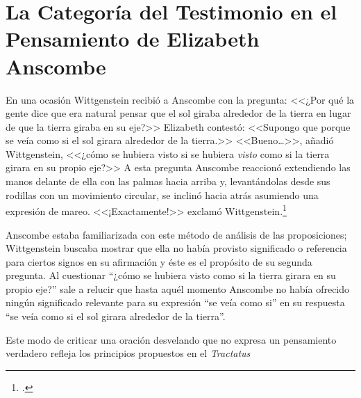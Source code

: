\documentclass[../main.tex]{subfiles}
\begin{document}
\chapter*{La Categoría del Testimonio en el Pensamiento de Elizabeth Anscombe}


En una ocasión Wittgenstein recibió a Anscombe con la pregunta: <<¿Por qué la gente dice que era natural pensar que el sol giraba alrededor de la tierra en lugar de que la tierra giraba en su eje?>> Elizabeth contestó: <<Supongo que porque se veía como si el sol girara alrededor de la tierra.>> <<Bueno\ldots>>, añadió Wittgenstein, <<¿cómo se hubiera visto si se hubiera \emph{visto} como si la tierra girara en su propio eje?>> A esta pregunta Anscombe reaccionó extendiendo las manos delante de ella con las palmas hacia arriba y, levantándolas desde sus rodillas con un movimiento circular, se inclinó hacia atrás asumiendo una expresión de mareo. <<¡Exactamente!>> exclamó Wittgenstein.\footcite[151]{IWT}

Anscombe estaba familiarizada con este método de análisis de las proposiciones; Wittgenstein buscaba mostrar que ella no había provisto significado o referencia para ciertos signos en su afirmación y éste es el propósito de su segunda pregunta. Al cuestionar ``¿cómo se hubiera visto como si la tierra girara en su propio eje?'' sale a relucir que hasta aquél momento Anscombe no había ofrecido ningún significado relevante para su expresión ``se veía como si'' en su respuesta ``se veía como si el sol girara alrededor de la tierra''. 

Este modo de criticar una oración desvelando que no expresa un pensamiento verdadero refleja los principios propuestos en el \emph{Tractatus}
\end{document}
